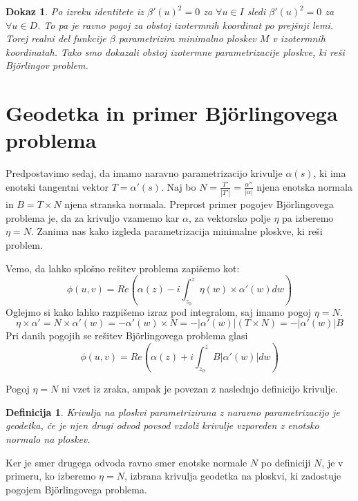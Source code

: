 \documentclass{article}
\newtheorem{definicija}{Definicija}
\newtheorem{dokaz}{Dokaz}
\begin{document}
\begin{dokaz}
            Po izreku identitete iz $\beta'(u)^2 = 0$ za $\forall u \in I$ sledi $\beta'(u)^2 = 0$ za $\forall u \in D$.
            To pa je ravno pogoj za obstoj izotermnih koordinat po prejšnji lemi.
            Torej realni del funkcije $\beta$ parametrizira minimalno ploskev $M$ v izotermnih koordinatah.
            Tako smo dokazali obstoj izotermne parametrizacije ploskve, ki reši Björlingov problem.
        \end{dokaz} 


    
    \section{Geodetka in primer Björlingovega problema}

        Predpostavimo sedaj, da imamo naravno parametrizacijo krivulje $\alpha(s)$, ki ima enotski tangentni vektor $T = \alpha'(s)$.
        Naj bo $N = \frac{T'}{| T' |} = \frac{\alpha''}{| \alpha |}$ njena enotska normala in $B = T \times N$ njena stranska normala.
        Preprost primer pogojev Björlingovega problema je, da za krivuljo vzamemo kar $\alpha$, za vektorsko polje $\eta$ pa izberemo $\eta = N$.
        Zanima nas kako izgleda parametrizacija minimalne ploskve, ki reši problem.

        Vemo, da lahko splošno rešitev problema zapišemo kot:
        $$ \phi (u, v) = Re \left( \alpha (z) - i \int_{z_0}^{z} \eta (w) \times \alpha' (w) dw \right) $$
        Oglejmo si kako lahko razpišemo izraz pod integralom, saj imamo pogoj $\eta = N$.
        $$ \eta \times \alpha' = N \times \alpha' (w) = - \alpha' (w) \times N = - | \alpha' (w) | (T \times N) = - | \alpha' (w) | B $$ 
        Pri danih pogojih se rešitev Björlingovega problema glasi
        $$ \phi (u, v) = Re \left( \alpha (z) + i \int_{z_0}^{z} B | \alpha' (w) | dw \right) $$

        Pogoj $\eta = N$ ni vzet iz zraka, ampak je povezan z naslednjo definicijo krivulje.

        \begin{definicija}
            Krivulja na ploskvi parametrizirana z naravno parametrizacijo je \emph{geodetka}, če je njen drugi odvod 
            povsod vzdolž krivulje vzporeden z enotsko normalo na ploskev. 
        \end{definicija}

        Ker je smer drugega odvoda ravno smer enotske normale $N$ po definiciji $N$, je v primeru, ko izberemo $\eta = N$,
        izbrana krivulja geodetka na ploskvi, ki zadostuje pogojem Björlingovega problema.
\end{document}

